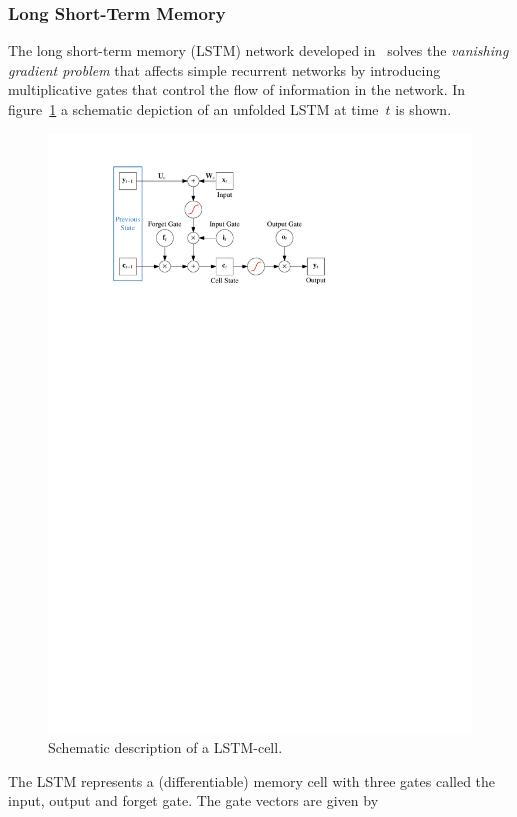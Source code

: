 \subsubsection{Long Short-Term Memory}
\label{sec:lstm}
The long short-term memory (LSTM) network developed in~\cite{lstm} solves the
\emph{vanishing gradient problem} that affects simple recurrent networks by
introducing multiplicative gates that control the flow of information in the
network. In figure~\ref{fig:schematic_lstm} a schematic depiction of an unfolded
LSTM at time~$t$ is shown.
\begin{figure}[htb]
  \centering
  \includegraphics{./figures/theory/LSTM.pdf}
  \caption{Schematic description of a LSTM-cell.}
  \label{fig:schematic_lstm}
\end{figure}
The LSTM represents a (differentiable) memory cell with three gates called the
input, output and forget gate. The gate vectors are given by

